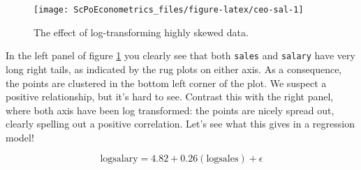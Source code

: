 \documentclass[]{book}
\newenvironment{Shaded}{\begin{snugshade}}{\end{snugshade}}
\newcommand{\DataTypeTok}[1]{\textcolor[rgb]{0.13,0.29,0.53}{#1}}
\newcommand{\DecValTok}[1]{\textcolor[rgb]{0.00,0.00,0.81}{#1}}
\newcommand{\KeywordTok}[1]{\textcolor[rgb]{0.13,0.29,0.53}{\textbf{#1}}}
\newcommand{\NormalTok}[1]{#1}
\newcommand{\OperatorTok}[1]{\textcolor[rgb]{0.81,0.36,0.00}{\textbf{#1}}}
\newcommand{\OtherTok}[1]{\textcolor[rgb]{0.56,0.35,0.01}{#1}}
\newcommand{\StringTok}[1]{\textcolor[rgb]{0.31,0.60,0.02}{#1}}
\begin{document}
\begin{Shaded}
\end{Shaded}

\begin{figure}

{\centering \texttt{[image: ScPoEconometrics\_files/figure-latex/ceo-sal-1]} 

}

\caption{The effect of log-transforming highly skewed data.}\label{fig:ceo-sal}
\end{figure}

In the left panel of figure \ref{fig:ceo-sal} you clearly see that both \texttt{sales} and \texttt{salary} have very long right tails, as indicated by the rug plots on either axis. As a consequence, the points are clustered in the bottom left corner of the plot. We suspect a positive relationship, but it's hard to see. Contrast this with the right panel, where both axis have been log transformed: the points are nicely spread out, clearly spelling out a positive correlation. Let's see what this gives in a regression model!

\[
\text{logsalary} = 4.82 + 0.26(\text{logsales}) + \epsilon
\]
\end{document}
